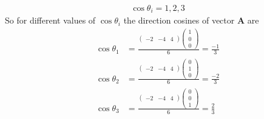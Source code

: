 \documentclass[12pt]{article}
\newcommand{\myvec}[1]{\ensuremath{\begin{pmatrix}#1\end{pmatrix}}}
\let\vec\mathbf
\begin{document}
\begin{enumerate}
\begin{align}
	\cos\theta_i=1,2,3  
\end{align}
		So for different values of $\cos\theta_i$ the direction cosines of vector $\vec{A}$ are
\begin{align}
	\cos\theta_1 &=\frac{\myvec{-2&-4&4}\myvec{1\\0\\0}}{6}=\frac{-1}{3}\\
	\cos\theta_2 &=\frac{\myvec{-2&-4&4}\myvec{0\\1\\0}}{6}=\frac{-2}{3}\\
	\cos\theta_3 &=\frac{\myvec{-2&-4&4}\myvec{0\\0\\1}}{6}=\frac{2}{3}
\end{align}
\end{enumerate}
\end{document}
